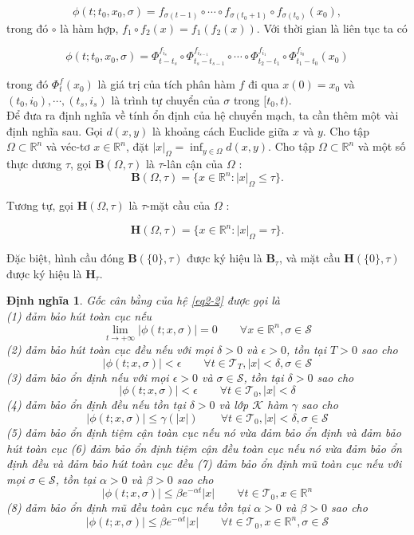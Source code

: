 \documentclass[14pt,a4paper,oneside]{report}		%
\newtheorem{define}[theorem]{Định nghĩa}
\begin{document}
\begin{equation} \label{eq2-4}
\phi (t;t_0,x_0,\sigma)=f_{\sigma (t-1)}\circ \cdots \circ f_{\sigma (t_0+1)}\circ f_{\sigma (t_0)}(x_0),
\end{equation}
trong đó $\circ$ là hàm hợp, $f_1 \circ f_2(x) = f_1(f_2(x))$. Với thời gian là liên tục ta có

\begin{equation} \label{eq2-5}
\phi (t;t_0,x_0,\sigma )=\Phi^{f_{i_s}}_{t-t_s}\circ\Phi^{f_{i_{s-1}}}_{t_s-t_{s-1}}\circ\cdots\circ\Phi^{f_{i_{1}}}_{t_2-t_{1}}\circ\Phi^{f_{i_{0}}}_{t_1-t_{0}}(x_0)
\end{equation}

trong đó $\Phi^f_t(x_0)$ là giá trị của tích phân hàm $f$ đi qua $x(0)=x_0$ và $(t_0,i_0),\cdots ,(t_s,i_s)$ là trình tự chuyển của $\sigma$ trong $[t_0,t)$.\\
Để đưa ra định nghĩa về tính ổn định của hệ chuyển mạch, ta cần thêm một vài định nghĩa sau. Gọi $d(x,y)$ là khoảng cách Euclide giữa $x$ và $y$. Cho tập $\Omega \subset\mathbb{R}^n$ và véc-tơ $x\in\mathbb{R}^n$, đặt $|x|_\Omega = \inf_{y\in\Omega}d(x,y)$. Cho tập $\Omega\subset\mathbb{R}^n$ và một số thực dương $\tau$, gọi $\mathbf{B}(\Omega , \tau)$ là $\tau$-lân cận của $\Omega$ :
$$\mathbf{B}(\Omega,\tau)=\{x\in\mathbb{R}^n:|x|_\Omega\leq\tau\}.$$

Tương tự, gọi $\mathbf{H}(\Omega,\tau)$ là $\tau$-mặt cầu của $\Omega$ :

$$\mathbf{H}(\Omega,\tau)=\{x\in\mathbb{R}^n:|x|_\Omega=\tau\}.$$

Đặc biệt, hình cầu đóng $\mathbf{B}(\{0\},\tau)$ được ký hiệu là $\mathbf{B}_\tau$, và mặt cầu $\mathbf{H}(\{0\},\tau)$ được ký hiệu là $\mathbf{H}_\tau$.

\begin{define}
Gốc cân bằng của hệ \ref{eq2-2} được gọi là\\
(1) đảm bảo hút toàn cục nếu
$$\lim_{t\rightarrow +\infty}|\phi (t;x,\sigma)|=0\qquad\forall x\in\mathbb{R}^n, \sigma\in\mathcal{S}$$
(2) đảm bảo hút toàn cục đều nếu với mọi $\delta >0$ và $\epsilon >0$, tồn tại $T>0$ sao cho
$$|\phi (t;x,\sigma)|<\epsilon\qquad\forall t\in\mathcal{T}_T, |x|<\delta,\sigma\in\mathcal{S}$$
(3) đảm bảo ổn định nếu với mọi $\epsilon > 0$ và $\sigma\in\mathcal{S}$, tồn tại $\delta >0$ sao cho
$$|\phi (t;x,\sigma)|<\epsilon\qquad\forall t\in\mathcal{T}_0, |x|<\delta$$
(4) đảm bảo ổn định đều nếu tồn tại $\delta > 0$ và lớp $\mathcal{K}$ hàm $\gamma$ sao cho
$$|\phi (t;x,\sigma)|\leq \gamma(|x|)\qquad\forall t\in\mathcal{T}_0, |x|<\delta,\sigma\in\mathcal{S}$$
(5) đảm bảo ổn định tiệm cận toàn cục nếu nó vừa đảm bảo ổn định và đảm bảo hút toàn cục
(6) đảm bảo ổn định tiệm cận đều toàn cục nếu nó vừa đảm bảo ổn định đều và đảm bảo hút toàn cục đều
(7) đảm bảo ổn định mũ toàn cục nếu với mọi $\sigma\in\mathcal{S}$, tồn tại $\alpha>0$ và $\beta >0$ sao cho
$$|\phi (t;x,\sigma)|\leq \beta e^{-\alpha t}|x|\qquad\forall t\in\mathcal{T}_0, x\in\mathbb{R}^n$$
(8) đảm bảo ổn định mũ đều toàn cục nếu tồn tại $\alpha>0$ và $\beta >0$ sao cho
$$|\phi (t;x,\sigma)|\leq \beta e^{-\alpha t}|x|\qquad\forall t\in\mathcal{T}_0, x\in\mathbb{R}^n, \sigma\in\mathcal{S}$$
\end{define}
\end{document}
